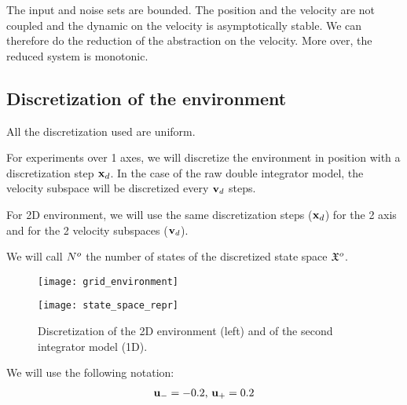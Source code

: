 The input and noise sets are bounded. The position and the velocity are not coupled and the dynamic on the velocity is asymptotically stable.
We can therefore do the reduction of the abstraction on the velocity. More over, the reduced system is monotonic.

\subsection{Discretization of the environment}
All the discretization used are uniform.

For experiments over 1 axes, we will discretize the environment in position with a discretization step $ \mathbf{x}_d$. In the case of the raw double integrator model, the velocity subspace will be discretized every $ \mathbf{v}_d$ steps.

For 2D environment, we will use the same discretization steps ($ \mathbf{x}_d$) for the 2 axis and for the 2 velocity subspaces ($ \mathbf{v}_d$).

We will call $N^o$ the number of states of the discretized state space $\mathfrak{X}^o$.

\begin{figure}
\centering
\begin{minipage}[b]{0.49\linewidth}
\texttt{[image: grid\_environment]}
\end{minipage}
\begin{minipage}[b]{0.49\linewidth}
\texttt{[image: state\_space\_repr]}
\end{minipage}
\caption{Discretization of the 2D environment (left) and of the second integrator model (1D).}
\end{figure}

We will use the following notation:
\begin{equation}
\begin{split}
 \mathbf{u}_{-} = -0.2
\textrm{, }
 \mathbf{u}_{+} = 0.2
\end{split}
\end{equation}
